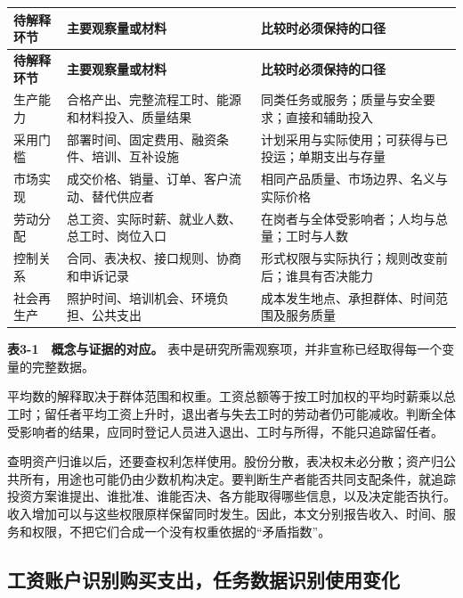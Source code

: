\documentclass[UTF8,fontset=windows,12pt,a4paper,oneside,openany]{ctexbook}
\begin{document}
\begingroup\footnotesize\setlength{\tabcolsep}{4pt}\renewcommand{\arraystretch}{1.25}
\begin{longtable}{>{\raggedright\arraybackslash}p{}>{\raggedright\arraybackslash}p{}>{\raggedright\arraybackslash}p{}}
\toprule
\textbf{待解释环节} & \textbf{主要观察量或材料} & \textbf{比较时必须保持的口径} \\
\midrule\endfirsthead
\toprule
\textbf{待解释环节} & \textbf{主要观察量或材料} & \textbf{比较时必须保持的口径} \\
\midrule\endhead
\bottomrule\endfoot
生产能力 & 合格产出、完整流程工时、能源和材料投入、质量结果 & 同类任务或服务；质量与安全要求；直接和辅助投入 \\
采用门槛 & 部署时间、固定费用、融资条件、培训、互补设施 & 计划采用与实际使用；可获得与已投运；单期支出与存量 \\
市场实现 & 成交价格、销量、订单、客户流动、替代供应者 & 相同产品质量、市场边界、名义与实际价格 \\
劳动分配 & 总工资、实际时薪、就业人数、总工时、岗位入口 & 在岗者与全体受影响者；人均与总量；工时与人数 \\
控制关系 & 合同、表决权、接口规则、协商和申诉记录 & 形式权限与实际执行；规则改变前后；谁具有否决能力 \\
社会再生产 & 照护时间、培训机会、环境负担、公共支出 & 成本发生地点、承担群体、时间范围及服务质量 \\
\end{longtable}\endgroup


\textbf{表3-1　概念与证据的对应。} 表中是研究所需观察项，并非宣称已经取得每一个变量的完整数据。

平均数的解释取决于群体范围和权重。工资总额等于按工时加权的平均时薪乘以总工时；留任者平均工资上升时，退出者与失去工时的劳动者仍可能减收。判断全体受影响者的结果，应同时登记人员进入退出、工时与所得，不能只追踪留任者。

查明资产归谁以后，还要查权利怎样使用。股份分散，表决权未必分散；资产归公共所有，用途也可能仍由少数机构决定。要判断生产者能否共同支配条件，就追踪投资方案谁提出、谁批准、谁能否决、各方能取得哪些信息，以及决定能否执行。收入增加可以与这些权限原样保留同时发生。因此，本文分别报告收入、时间、服务和权限，不把它们合成一个没有权重依据的“矛盾指数”。

\subsection{工资账户识别购买支出，任务数据识别使用变化}
\end{document}
